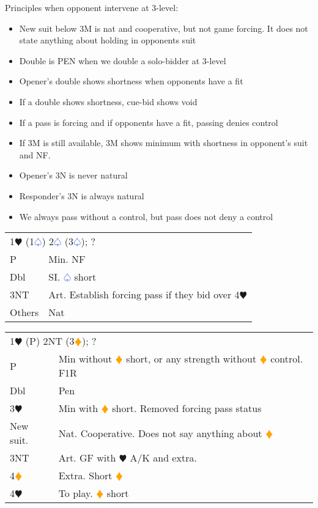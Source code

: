 \documentclass{article}
\renewcommand{\sp}{\textcolor{RoyalBlue}{$\varspade$}}
\newcommand{\he}{\textcolor{RubineRed}{$\varheart$}}
\newcommand{\di}{\textcolor{Orange}{$\vardiamond$}}
\newcommand{\nt}{\relsize{-1}NT\relsize{1}}
\begin{document}
Principles when opponent intervene at 3-level:
\begin{itemize}
	\itemsep0em
	\item New suit below 3M is nat and cooperative, but not game forcing. It does not state anything about holding in opponents suit
	\item Double is PEN when we double a solo-bidder at 3-level
	\item Opener's double shows shortness when opponents have a fit
	\item If a double shows shortness, cue-bid shows void
	\item If a pass is forcing and if opponents have a fit, passing denies control
	\item If 3M is still available, 3M shows minimum with shortness in opponent's suit and NF.
	\item Opener's 3N is never natural
	\item Responder's 3N is always natural
	\item We always pass without a control, but pass does not deny a control
\end{itemize}

\begin{tabular}{|l|p{6.5cm}}
	\multicolumn{2}{l}{1\he{} (1\sp{}) 2\sp{} (3\sp{}); ? }\\
	P & Min. NF \\
	Dbl & SI. \sp{} short \\
	3\nt{} & Art. Establish forcing pass if they bid over 4\he{} \\
	Others & Nat \\
\end{tabular}

\medskip

\begin{tabular}{|l|p{6.5cm}}
	\multicolumn{2}{l}{1\he{} (P) 2\nt{} (3\di{}); ? }\\
	P & Min without \di{} short, or any strength without \di{} control. F1R \\
	Dbl & Pen \\
	3\he{} & Min with \di{} short. Removed forcing pass status \\
	New suit. & Nat. Cooperative. Does not say anything about \di{} \\
	3\nt{} & Art. GF with \he{} A/K and extra. \\
	4\di{} & Extra. Short \di{} \\
	4\he{} & To play. \di{} short \\
\end{tabular}
\end{document}
